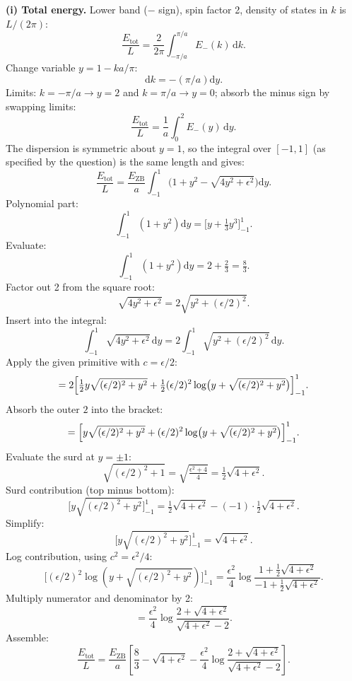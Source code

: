 \documentclass[11pt]{article}
\newcommand{\de}{\mathrm{d}}
\begin{document}
\textbf{(i) Total energy.} Lower band ($-$ sign), spin factor 2, density of states in $k$ is $L/(2\pi)$:
\[ \frac{E_{\text{tot}}}{L}=\frac{2}{2\pi}\int_{-\pi/a}^{\pi/a}E_-(k)\,\de k. \]
Change variable $y=1-ka/\pi$:
\[ \de k=-(\pi/a)\de y. \]
Limits: $k=-\pi/a\to y=2$ and $k=\pi/a\to y=0$; absorb the minus sign by swapping limits:
\[ \frac{E_{\text{tot}}}{L}=\frac{1}{a}\int_{0}^{2}E_-(y)\,\de y. \]
The dispersion is symmetric about $y=1$, so the integral over $[-1,1]$ (as specified by the question) is the same length and gives:
\begin{equation}
\frac{E_{\text{tot}}}{L}=\frac{E_{\text{ZB}}}{a}\int_{-1}^{1}\!\bigl(1+y^2-\sqrt{4y^2+\epsilon^2}\bigr)\de y.
\label{eq:Etot-int}
\end{equation}
Polynomial part:
\[ \int_{-1}^{1}(1+y^2)\de y=\bigl[y+\tfrac13 y^3\bigr]_{-1}^{1}. \]
Evaluate:
\[ \int_{-1}^{1}(1+y^2)\de y=2+\tfrac23=\tfrac{8}{3}. \]
Factor out 2 from the square root:
\[ \sqrt{4y^2+\epsilon^2}=2\sqrt{y^2+(\epsilon/2)^2}. \]
Insert into the integral:
\[ \int_{-1}^{1}\sqrt{4y^2+\epsilon^2}\,\de y=2\int_{-1}^{1}\sqrt{y^2+(\epsilon/2)^2}\,\de y. \]
Apply the given primitive with $c=\epsilon/2$:
\[ =2\Bigl[\tfrac12 y\sqrt{(\epsilon/2)^2+y^2}+\tfrac12(\epsilon/2)^2\log\bigl(y+\sqrt{(\epsilon/2)^2+y^2}\bigr)\Bigr]_{-1}^{1}. \]
Absorb the outer $2$ into the bracket:
\[ =\Bigl[y\sqrt{(\epsilon/2)^2+y^2}+(\epsilon/2)^2\log\bigl(y+\sqrt{(\epsilon/2)^2+y^2}\bigr)\Bigr]_{-1}^{1}. \]
Evaluate the surd at $y=\pm 1$:
\[ \sqrt{(\epsilon/2)^2+1}=\sqrt{\tfrac{\epsilon^2+4}{4}}=\tfrac12\sqrt{4+\epsilon^2}. \]
Surd contribution (top minus bottom):
\[ \bigl[y\sqrt{(\epsilon/2)^2+y^2}\bigr]_{-1}^{1}=\tfrac12\sqrt{4+\epsilon^2}-(-1)\cdot\tfrac12\sqrt{4+\epsilon^2}. \]
Simplify:
\[ \bigl[y\sqrt{(\epsilon/2)^2+y^2}\bigr]_{-1}^{1}=\sqrt{4+\epsilon^2}. \]
Log contribution, using $c^2=\epsilon^2/4$:
\[ \bigl[(\epsilon/2)^2\log(y+\sqrt{(\epsilon/2)^2+y^2})\bigr]_{-1}^{1}=\frac{\epsilon^2}{4}\log\!\frac{1+\tfrac12\sqrt{4+\epsilon^2}}{-1+\tfrac12\sqrt{4+\epsilon^2}}. \]
Multiply numerator and denominator by 2:
\[ =\frac{\epsilon^2}{4}\log\!\frac{2+\sqrt{4+\epsilon^2}}{\sqrt{4+\epsilon^2}-2}. \]
Assemble:
\begin{equation}
\boxed{\;\frac{E_{\text{tot}}}{L}=\frac{E_{\text{ZB}}}{a}\!\left[\frac{8}{3}-\sqrt{4+\epsilon^2}-\frac{\epsilon^2}{4}\log\!\frac{2+\sqrt{4+\epsilon^2}}{\sqrt{4+\epsilon^2}-2}\right].\;}
\label{eq:Etot-exact}
\end{equation}
\end{document}
